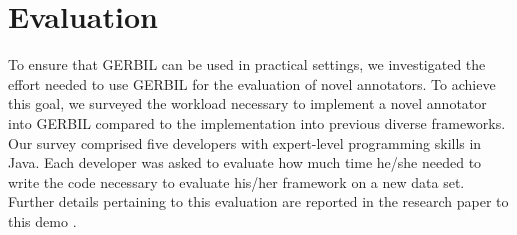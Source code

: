 


\section{Evaluation}
\label{sec:eval}
To ensure that GERBIL can be used in practical settings, we investigated the effort needed to use GERBIL for the evaluation of novel annotators.
To achieve this goal, we surveyed the workload necessary to implement a novel annotator into GERBIL compared to the implementation into previous diverse frameworks. 
Our survey comprised five developers with expert-level programming skills in Java. Each developer was asked to evaluate how much time he/she needed to write the code necessary to evaluate his/her framework on a new data set.
Further details pertaining to this evaluation are reported in the research paper to this demo \cite{GERBIL}.


